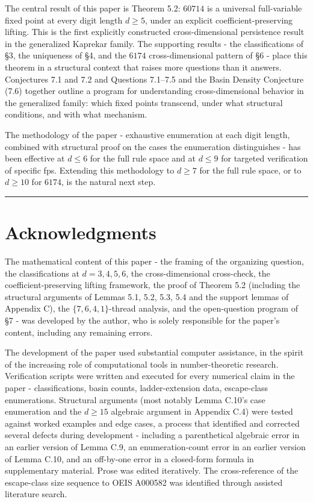 \documentclass[11pt,letterpaper]{article}
\theoremstyle{paperstyle}
\theoremstyle{paperstyledef}
\theoremstyle{paperstylerem}
\begin{document}
The central result of this paper is Theorem 5.2: \(60714\) is a
universal full-variable fixed point at every digit length \(d \geq 5\),
under an explicit coefficient-preserving lifting. This is the first
explicitly constructed cross-dimensional persistence result in the
generalized Kaprekar family. The supporting results - the
classifications of §3, the uniqueness of §4, and the \(6174\)
cross-dimensional pattern of §6 - place this theorem in a structural
context that raises more questions than it answers. Conjectures 7.1 and
7.2 and Questions 7.1--7.5 and the Basin Density Conjecture (7.6)
together outline a program for understanding cross-dimensional behavior
in the generalized family: which fixed points transcend, under what
structural conditions, and with what mechanism.

The methodology of the paper - exhaustive enumeration at each digit
length, combined with structural proof on the cases the enumeration
distinguishes - has been effective at \(d \leq 6\) for the full rule
space and at \(d \leq 9\) for targeted verification of specific fps.
Extending this methodology to \(d \geq 7\) for the full rule space, or
to \(d \geq 10\) for \(6174\), is the natural next step.

\begin{center}\rule{0.5\linewidth}{0.5pt}\end{center}

\hypertarget{acknowledgments}{%
\section{Acknowledgments}\label{acknowledgments}}

The mathematical content of this paper - the framing of the organizing
question, the classifications at \(d = 3, 4, 5, 6\), the
cross-dimensional cross-check, the coefficient-preserving lifting
framework, the proof of Theorem 5.2 (including the structural arguments
of Lemmas 5.1, 5.2, 5.3, 5.4 and the support lemmas of Appendix C), the
\(\{7, 6, 4, 1\}\)-thread analysis, and the open-question program of §7 - was developed by the author, who is solely responsible for the
paper's content, including any remaining errors.

The development of the paper used substantial computer assistance, in
the spirit of the increasing role of computational tools in
number-theoretic research. Verification scripts were written and
executed for every numerical claim in the paper - classifications,
basin counts, ladder-extension data, escape-class enumerations.
Structural arguments (most notably Lemma C.10's case enumeration and the
\(d \geq 15\) algebraic argument in Appendix C.4) were tested against
worked examples and edge cases, a process that identified and corrected
several defects during development - including a parenthetical
algebraic error in an earlier version of Lemma C.9, an enumeration-count
error in an earlier version of Lemma C.10, and an off-by-one error in a
closed-form formula in supplementary material. Prose was edited
iteratively. The cross-reference of the escape-class size sequence to
OEIS A000582 was identified through assisted literature search.
\end{document}
